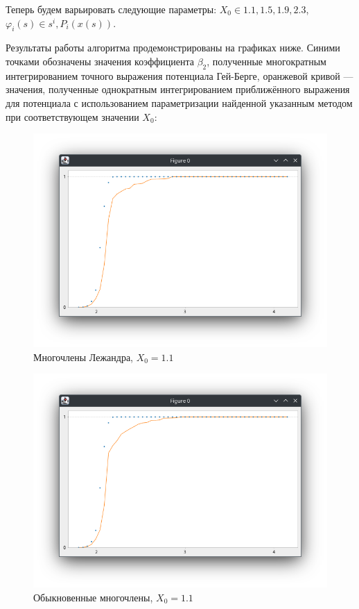 \documentclass[a4paper,14pt]{extarticle}
\begin{document}
    Теперь будем варьировать следующие параметры:
    $X_0 \in {1.1, 1.5, 1.9, 2.3}$, $\varphi_i(s) \in {s^i, P_i(x(s))}$.

    Результаты работы алгоритма продемонстрированы
    на графиках ниже.
    Синими точками обозначены значения коэффициента
    $\beta_2$, полученные многократным интегрированием
    точного выражения потенциала Гей-Берге, оранжевой
    кривой --- значения, полученные однократным
    интегрированием приближённого выражения
    для потенциала с использованием параметризации
    найденной указанным методом при соответствующем
    значении $X_0$:

    \begin{figure}[h]
        \centering
        \includegraphics[scale=0.5]{images/lege11}
        \caption{Многочлены Лежандра, $X_0 = 1.1$}
    \end{figure}

    \newpage

    \begin{figure}[h]
        \centering
        \includegraphics[scale=0.5]{images/poly11}
        \caption{Обыкновенные многочлены, $X_0 = 1.1$}
    \end{figure}
\end{document}
